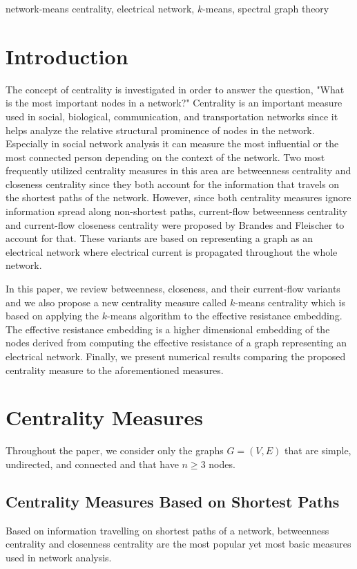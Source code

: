 \documentclass[10pt]{siamltex}
\begin{document}
\begin{pagewiselinenumbers}
\begin{keywords} network-means centrality, electrical network, $k$-means, spectral graph theory
\end{keywords}


\section{Introduction}

The concept of centrality is investigated in order to answer the question, "What is the most important nodes in a network?" Centrality is an important measure used in social, biological, communication, and transportation networks since it helps analyze the relative structural prominence of nodes in the network. Especially in social network analysis it can measure the most influential or the most connected person depending on the context of the network. Two most frequently utilized centrality measures in this area are betweenness centrality and closeness centrality since they both account for the information that travels on the shortest paths of the network. However, since both centrality measures ignore information spread along non-shortest paths, current-flow betweenness centrality and current-flow closeness centrality were proposed by Brandes and Fleischer \cite{brandes2005centrality} to account for that. These variants are based on representing a graph as an electrical network where electrical current is propagated throughout the whole network.

In this paper, we review betweenness, closeness, and their current-flow variants and we also propose a new centrality measure called $k$-means centrality which is based on applying the  $k$-means algorithm to the effective resistance embedding. The effective resistance embedding is a higher dimensional embedding of the nodes derived from computing the effective resistance of a graph representing an electrical network. Finally, we present numerical results comparing the proposed centrality measure to the aforementioned measures. 

\section{Centrality Measures}
Throughout the paper, we consider only the graphs $G = (V,E)$ that are simple, undirected, and connected and that have $n \geq 3$ nodes. 
\subsection{Centrality Measures Based on Shortest Paths}
Based on information travelling on shortest paths of a network, betweenness centrality and closenness centrality are the most popular yet most basic measures used in network analysis. 


\end{pagewiselinenumbers}
\end{document}
